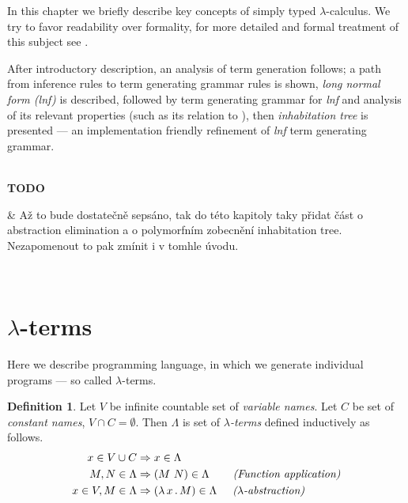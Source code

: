 \documentclass[12pt,a4paper]{report}
\newcommand{\lterms}{$\lambda$-terms\xspace}
\newenvironment{todo}
{ ~\\[0.5em]
  {\color{red}\textbf{TODO}}
  \begin{easylist}[itemize]}
{ \end{easylist}
  ~}
\begin{document}
\newcommand{\lnf}{\textit{lnf}\xspace}


In this chapter we briefly describe key concepts
of simply typed $\lambda$-calculus.
We try to favor readability over formality,
for more detailed and formal treatment of this subject see 
\cite{barendregt92,barendregt10}.

After introductory description, an analysis of term generation follows; 
a path from inference rules to term generating grammar rules is shown,
\textit{long normal form (lnf)} is described,
followed by term generating grammar for \textit{lnf}
and analysis of its relevant properties (such as its relation to \benf),
then \textit{inhabitation tree} is presented --- 
an implementation friendly refinement of 
\textit{lnf} term generating grammar.

\begin{todo}
 & Až to bude dostatečně sepsáno, tak do této kapitoly taky přidat
   část o abstraction elimination a o polymorfním zobecnění inhabitation tree.
   Nezapomenout to pak zmínit i v tomhle úvodu.
\end{todo}
	
\theoremstyle{plain} 
\newtheorem{theorem}{Theorem} 
\newtheorem{proposition}{Proposition} 
\newtheorem{lemma}{Lemma} 
\newtheorem*{corollary}{Corollary}

\theoremstyle{definition} 
\newtheorem*{definition}{Definition} 
\newtheorem{conjecture}{Conjecture}
 \newtheorem*{example}{Example} 

\theoremstyle{remark} 
\newtheorem*{remark}{Remark} 
\newtheorem*{note}{Note} 
\newtheorem{case}{Case}

		
\section{\lterms}
\label{deflam}

Here we  %
describe programming language, 
in which we generate individual programs --- so called \lterms.  






\begin{definition}

Let $V$ be infinite countable set of {\it 
variable names}. Let $C$ be set of {\it constant names}, 
$V \cap C = \emptyset$.	 	
Then $\Lambda$ is set of {\it \lterms} defined inductively as follows.	
\begin{align*}
x   \in V \cup C  &\Rightarrow x     \in \Lambda \\
M,N \in \Lambda   &\Rightarrow (M~N) \in \Lambda 
\textit{~~~~~~(Function application)} \\
x   \in V , M \in \Lambda &\Rightarrow ( \lambda \, x \, . \, M ) \in \Lambda
\textit{~~~~($\lambda$-abstraction)} 
\end{align*}~
\end{definition}
\end{document}
